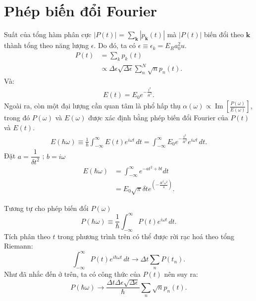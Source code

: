 \documentclass[%
reprint,
amsmath,amssymb,
superscriptaddress,
aps,
]{revtex4-2}
\newcommand{\f}[2]{\dfrac{#1}{#2}}
\begin{document}
\section{\label{APPENDIX B} Phép biến đổi Fourier}
Suất của tổng hàm phân cực $\left| P(t) \right|$ = $\sum_\mathbf{k}$$\left| p_\mathbf{k}(t)\right|$ mà $\left| P(t) \right|$ biến đổi theo $\mathbf{k}$ thành tổng theo năng lượng $\epsilon$. Do đó, ta có $\epsilon \equiv \epsilon_k = E_R a_{0}^{2} u$.
\begin{equation}
	\begin{aligned}
		P(t) 
		&= \sum_k p_k(t) \\ 
		&\propto \Delta \epsilon \sqrt{\Delta \epsilon} \sum_n^N \sqrt{n} p_n(t).
	\end{aligned}
\end{equation}
Và:
\begin{gather}
	E(t) = E_0 e^{-\frac{t^2}{\delta t^2}}.
\end{gather}
Ngoài ra, còn một đại lượng cần quan tâm là phổ hấp thụ $\alpha(\omega) \propto \operatorname{Im} \left[\frac{P(\omega)}{E(\omega)}\right]$, trong đó $P(\omega)$ và $E(\omega)$ được xác định bằng phép biến đổi Fourier của $P(t)$ và $E(t)$.
\begin{equation}
	\begin{aligned}
		E(\hbar \omega) \equiv \frac{1}{\hbar}\int_{-\infty}^{\infty} E(t) e^{i\omega t} \, dt = \int_{-\infty}^{\infty}  E_0 e^{-\frac{t^2}{\delta t^2}} e^{i\omega t} \, dt.
	\end{aligned}
\end{equation}
Đặt $a = \f{1}{\delta t^2}$ ; $b = i\omega$
\begin{equation}
	\begin{aligned}
		E(\hbar \omega) 
		&= \int_{-\infty}^{\infty} e^{-at^2 + bt} dt\\
		&= E_0 \sqrt{\pi} \delta t e^{\left( -\frac{\delta t^2 \omega^2}{4} \right)}.
	\end{aligned}
\end{equation}

Tương tự cho phép biến đổi $P(\omega)$
\begin{equation}
	P(\hbar \omega) \equiv \frac{1}{\hbar}\int_{-\infty}^{\infty} P(t) e^{i\omega t} \, dt.
\end{equation}
Tích phân theo $t$ trong phương trình trên có thể được rời rạc hoá theo tổng Riemann:
\begin{equation*}
	\int_{-\infty}^{\infty} P(t) e^{i\hbar \omega t} \, dt \rightarrow \Delta t \sum_n P(t_n).
\end{equation*}
Như đã nhắc đến ở trên, ta có công thức của $P(t)$ nên suy ra:
\begin{equation}
	P(\hbar \omega) \rightarrow \frac{\Delta t \Delta \epsilon \sqrt{\Delta \epsilon}}{\hbar}\sum_n \sqrt{n} p_n(t).
\end{equation}
\nocite{*}

\end{document}
